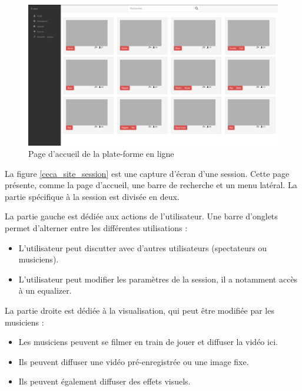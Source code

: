 \documentclass[a4,12pt]{article}
\begin{document}
\begin{figure}[!ht]
    \center
    \includegraphics[width=15cm]{ceca_site_accueil.png}
    \caption{Page d'accueil de la plate-forme en ligne}
    \label{ceca_site_accueil}
\end{figure}

La figure \ref{ceca_site_session} est une capture d'écran d'une session. Cette page
présente, comme la page d'accueil, une barre de recherche et un menu latéral.
La partie spécifique à la session est divisée en deux.

La partie gauche est dédiée aux actions de l'utilisateur. Une barre d'onglets permet
d'alterner entre les différentes utilisations :
\begin{itemize}
    \item L'utilisateur peut discutter avec d'autres utilisateurs (spectateurs ou
    musiciens).
    \item L'utilisateur peut modifier les paramètres de la session, il a notamment
    accès à un equalizer.
\end{itemize}

La partie droite est dédiée à la visualisation, qui peut être modifiée par les musiciens :
\begin{itemize}
    \item Les musiciens peuvent se filmer en train de jouer et diffuser la vidéo ici.
    \item Ils peuvent diffuser une vidéo pré-enregistrée ou une image fixe.
    \item Ils peuvent également diffuser des effets visuels.
\end{itemize}
\end{document}
